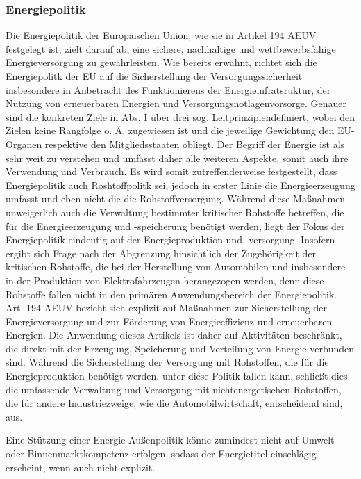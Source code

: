 \documentclass[12pt,a4paper,oneside]{book} %
\begin{document}
	\subsubsection{Energiepolitik}
	Die Energiepolitik der Europäischen Union, wie sie in Artikel 194 AEUV festgelegt ist, zielt darauf ab, eine sichere, nachhaltige und wettbewerbsfähige Energieversorgung zu gewährleisten. Wie bereits erwähnt, richtet sich die Energiepolitk der EU auf die Sicherstellung der Versorgungssicherheit insbesondere in Anbetracht des Funktionierens der Energieinfratsruktur, der Nutzung von erneuerbaren Energien und Versorgungsnotlagenvorsorge.\autocite[387]{frau_rohstoffe_2025} Genauer sind die konkreten Ziele in Abs. I über drei sog. \glqq Leitprinzipien\grqq definiert, wobei den Zielen keine Rangfolge o. Ä. zugewiesen ist und die jeweilige Gewichtung den EU-Organen respektive den Mitgliedsstaaten obliegt.\autocite[Gundel § M Rn. 26 27]{dauses_handbuch_2024} 
	Der Begriff der Energie ist als sehr weit zu verstehen und umfasst daher alle weiteren Aspekte, somit auch ihre Verwendung und Verbrauch.\autocite[Hamer Art. 194 Rn 8]{von_der_groeben_europaisches_2024} 
	Es wird somit zutreffenderweise festgestellt, dass Energiepolitik auch Roshtoffpolitk sei, jedoch in erster Linie die Energieerzeugung umfasst und eben nicht die die Rohstoffversorgung. Während diese Maßnahmen unweigerlich auch die Verwaltung bestimmter kritischer Rohstoffe betreffen, die für die Energieerzeugung und -speicherung benötigt werden, liegt der Fokus der Energiepolitik eindeutig auf der Energieproduktion und -versorgung.
	Insofern ergibt sich Frage nach der Abgrenzung hinsichtlich der Zugehörigkeit der kritischen Rohstoffe, die bei der Herstellung von Automobilen und insbesondere in der Produktion von Elektrofahrzeugen herangezogen werden, denn diese Rohstoffe fallen nicht in den primären Anwendungsbereich der Energiepolitik. Art. 194 AEUV bezieht sich explizit auf Maßnahmen zur Sicherstellung der Energieversorgung und zur Förderung von Energieeffizienz und erneuerbaren Energien. Die Anwendung dieses Artikels ist daher auf Aktivitäten beschränkt, die direkt mit der Erzeugung, Speicherung und Verteilung von Energie verbunden sind. Während die Sicherstellung der Versorgung mit Rohstoffen, die für die Energieproduktion benötigt werden, unter diese Politik fallen kann, schließt dies die umfassende Verwaltung und Versorgung mit nichtenergetischen Rohstoffen, die für andere Industriezweige, wie die Automobilwirtschaft, entscheidend sind, aus.
	
		Eine Stützung einer Energie-Außenpolitik könne zumindest nicht auf Umwelt- oder Binnenmarktkompetenz erfolgen, sodass der Energietitel einschlägig erscheint, wenn auch nicht explizit.\autocite{Gundel, Theobald/Kühling, Europäisches Energierecht, V. Rn. 87}
	
\end{document}
